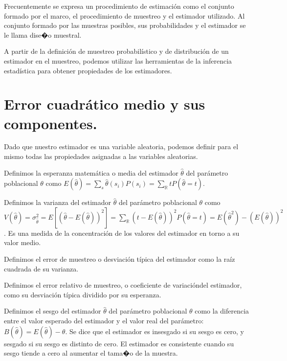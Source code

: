 Frecuentemente se expresa un procedimiento de estimaci\'on como el conjunto
formado por el marco, el procedimiento de muestreo y el estimador
utilizado. Al conjunto formado por las muestras posibles, sus probabilidades
y el estimador se le llama dise�o muestral.

A partir de la definici\'on de muestreo probabil\'istico y de distribuci\'on
de un estimador en el muestreo, podemos utilizar las herramientas
de la inferencia estad\'istica para obtener propiedades de los estimadores.


\section{Error cuadr\'atico medio y sus componentes.}

Dado que nuestro estimador es una variable aleatoria, podemos definir
para el mismo todas las propiedades asignadas a las variables aleatorias.

Definimos la esperanza matem\'atica o media del estimador $\hat{\theta}$
del par\'ametro poblacional $\theta$ como $E\left(\hat{\theta}\right)=\sum_{s}\hat{\theta}\left(s_{i}\right)P\left(s_{i}\right)=\sum_{\mathbb{R}}tP\left(\hat{\theta}=t\right)$.

Definimos la varianza del estimador $\hat{\theta}$ del par\'ametro
poblacional $\theta$ como $V\left(\hat{\theta}\right)=\sigma_{\hat{\theta}}^{2}=E\left[\left(\hat{\theta}-E\left(\hat{\theta}\right)\right)^{2}\right]=\sum_{\mathbb{R}}\left(t-E\left(\hat{\theta}\right)\right)^{2}P\left(\hat{\theta}=t\right)=E\left(\hat{\theta}^{2}\right)-\left(E\left(\hat{\theta}\right)\right)^{2}$.
Es una medida de la concentraci\'on de los valores del estimador en
torno a su valor medio.

Definimos el error de muestreo o desviaci\'on t\'ipica del estimador como
la ra\'iz cuadrada de su varianza.

Definimos el error relativo de muestreo, o coeficiente de variaci\'ondel
estimador, como su desviaci\'on t\'ipica dividido por su esperanza.

Definimos el sesgo del estimador $\hat{\theta}$ del par\'ametro poblacional
$\theta$ como la diferencia entre el valor esperado del estimador
y el valor real del par\'ametro: $B\left(\hat{\theta}\right)=E\left(\hat{\theta}\right)-\theta$.
Se dice que el estimador es insesgado si su sesgo es cero, y sesgado
si su sesgo es distinto de cero. El estimador es consistente cuando
su sesgo tiende a cero al aumentar el tama�o de la muestra.

